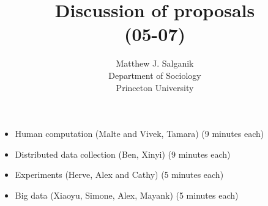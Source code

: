 \documentclass[aspectratio=169]{beamer}
\title[]{Discussion of proposals\\(05-07)}
\author[]{Matthew J. Salganik\\Department of Sociology\\Princeton University}
\date[]{Soc 596: Computational Social Science\\Fall 2016
\vfill
\begin{flushright}
\vspace{0.6in}
\texttt{[image: figures/cc.png]}
\end{flushright}
}
\begin{document}
\frame{\titlepage}
\begin{frame}

\begin{itemize}
\item Human computation (Malte and Vivek, Tamara) (9 minutes each)
\item Distributed data collection (Ben, Xinyi) (9 minutes each)
\item Experiments (Herve, Alex and Cathy) (5 minutes each)
\item Big data (Xiaoyu, Simone, Alex, Mayank) (5 minutes each)
\end{itemize}

\end{frame}
\end{document}

